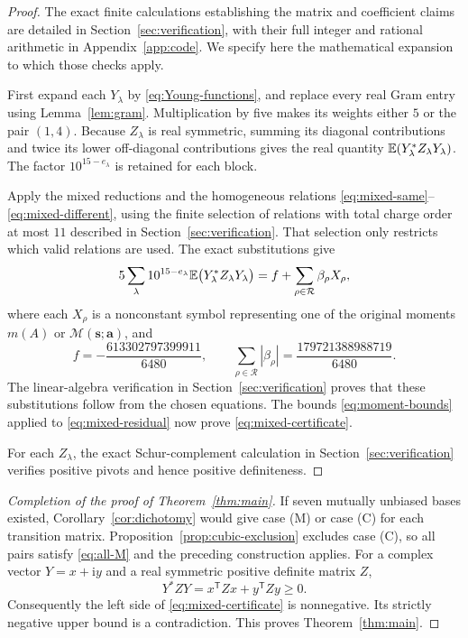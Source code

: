 \begin{proof}
The exact finite calculations establishing the matrix and coefficient
claims are detailed in Section~\ref{sec:verification}, with their full
integer and rational arithmetic in Appendix~\ref{app:code}. We specify
here the mathematical expansion to which those checks apply.

First expand each $Y_\lambda$ by \eqref{eq:Young-functions}, and replace
every real Gram entry using Lemma~\ref{lem:gram}. Multiplication by
five makes its weights either $5$ or the pair $(1,4)$. Because
$Z_\lambda$ is real symmetric, summing its diagonal contributions and
twice its lower off-diagonal contributions gives the real quantity
$\mathbb E(Y_\lambda^*Z_\lambda Y_\lambda)$. The factor
$10^{15-e_\lambda}$ is retained for each block.

Apply the mixed reductions and the homogeneous relations
\eqref{eq:mixed-same}--\eqref{eq:mixed-different}, using the finite
selection of relations with total charge order at most $11$ described
in Section~\ref{sec:verification}. That selection only restricts which
valid relations are used. The exact substitutions give
\begin{equation}\label{eq:mixed-residual}
 5\sum_\lambda 10^{15-e_\lambda}
       \mathbb E\bigl(Y_\lambda^*Z_\lambda Y_\lambda\bigr)
    = f+\sum_{\rho\in\mathcal R}\beta_\rho X_\rho,
\end{equation}
where each $X_\rho$ is a nonconstant symbol representing one of the
original moments $m(A)$ or $\mathcal M(\mathbf s;\mathbf a)$, and
\begin{equation}\label{eq:mixed-coefficients}
 f=-\frac{613302797399911}{6480},\qquad
 \sum_{\rho\in\mathcal R}|\beta_\rho|
     =\frac{179721388988719}{6480}.
\end{equation}
The linear-algebra verification in Section~\ref{sec:verification}
proves that these substitutions follow from the chosen equations.
The bounds \eqref{eq:moment-bounds} applied to
\eqref{eq:mixed-residual} now prove
\eqref{eq:mixed-certificate}.

For each $Z_\lambda$, the exact Schur-complement calculation in
Section~\ref{sec:verification} verifies positive pivots and hence positive
definiteness.
\end{proof}

\begin{proof}[Completion of the proof of Theorem~\ref{thm:main}]
If seven mutually unbiased bases existed, Corollary~\ref{cor:dichotomy}
would give case (M) or case (C) for each transition matrix.
Proposition~\ref{prop:cubic-exclusion} excludes case (C), so all pairs
satisfy \eqref{eq:all-M} and the preceding construction applies.
For a complex vector $Y=x+\mathrm i y$ and a real symmetric positive
definite matrix $Z$,
\[
 Y^*ZY=x^{\mathsf T}Zx+y^{\mathsf T}Zy\ge0.
\]
Consequently the left side of \eqref{eq:mixed-certificate} is
nonnegative. Its strictly negative upper bound is a contradiction.
This proves Theorem~\ref{thm:main}.
\end{proof}
